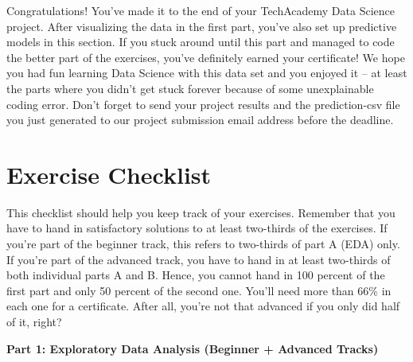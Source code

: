 \documentclass[
  11pt,
]{article}
\begin{document}
Congratulations! You've made it to the end of your TechAcademy Data Science project. After visualizing the data in the first part, you've also set up predictive models in this section. If you stuck around until this part and managed to code the better part of the exercises, you've definitely earned your certificate! We hope you had fun learning Data Science with this data set and you enjoyed it -- at least the parts where you didn't get stuck forever because of some unexplainable coding error. Don't forget to send your project results and the prediction-csv file you just generated to our project submission email address before the deadline.

\newpage

\hypertarget{exercise-checklist}{%
\section{Exercise Checklist}\label{exercise-checklist}}

This checklist should help you keep track of your exercises. Remember that you have to hand in satisfactory solutions to at least two-thirds of the exercises. If you're part of the beginner track, this refers to two-thirds of part A (EDA) only. If you're part of the advanced track, you have to hand in at least two-thirds of both individual parts A and B. Hence, you cannot hand in 100 percent of the first part and only 50 percent of the second one. You'll need more than 66\% in each one for a certificate. After all, you're not that advanced if you only did half of it, right?

\textbf{Part 1: Exploratory Data Analysis (Beginner + Advanced Tracks)}
\end{document}
